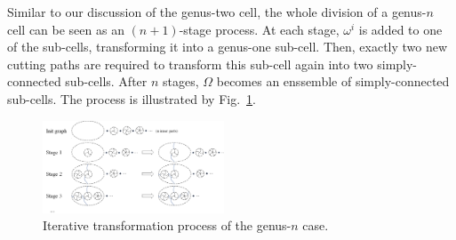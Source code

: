\documentclass[journal]{IEEEtran}
\begin{document}
Similar to our discussion of the genus-two cell, the whole division of a genus-$n$ cell can be seen as an $(n+1)$-stage process. 
At each stage, $\omega^i$ is added to one of the sub-cells, transforming it into a genus-one sub-cell. Then, exactly two new cutting paths are required to transform this sub-cell again into two simply-connected sub-cells. 
After $n$ stages, $\Omega$ becomes an enssemble of simply-connected sub-cells. The process is illustrated 
by Fig.~\ref{fig_iterative_process}. 

\begin{figure}[t]
\centering
\includegraphics[width=0.48\textwidth]{figures/proof/fig_iterative_process_2}
\caption{Iterative transformation process of the genus-$n$ case.}%
\label{fig_iterative_process}
\end{figure}

\end{document}
